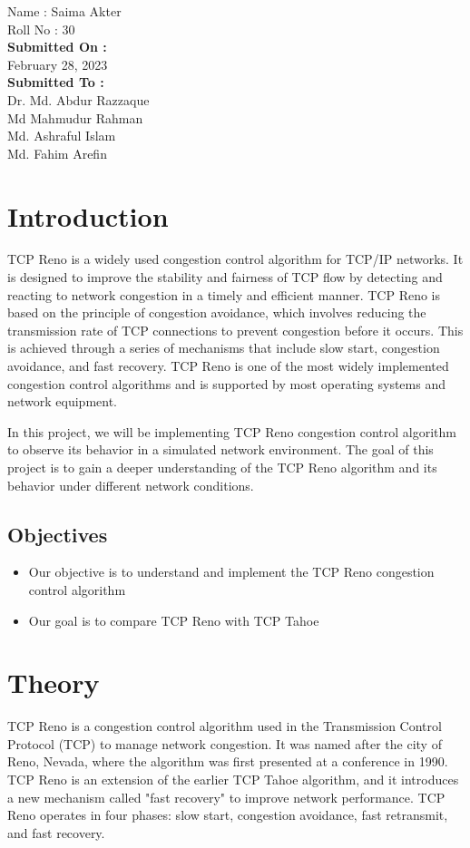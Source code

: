 \documentclass[11pt]{article}
\begin{document}
\begin{titlepage}
\begin{large}
			Name : Saima Akter\\[8pt]
			Roll No : 30\\[12pt]
		\textbf{Submitted On : \\[12pt]}
			February 28, 2023\\[20pt]
		\textbf{Submitted To :\\[12pt]}
			Dr. Md. Abdur Razzaque\\[12pt]
                Md Mahmudur Rahman\\[12pt]
                Md. Ashraful Islam\\[12pt]
                Md. Fahim Arefin
	\end{large}
\end{titlepage}

\section{Introduction}
TCP Reno is a widely used congestion control algorithm for TCP/IP networks. It is designed to improve the stability and fairness of TCP flow by detecting and reacting to network congestion in a timely and efficient manner. TCP Reno is based on the principle of congestion avoidance, which involves reducing the transmission rate of TCP connections to prevent congestion before it occurs. This is achieved through a series of mechanisms that include slow start, congestion avoidance, and fast recovery. TCP Reno is one of the most widely implemented congestion control algorithms and is supported by most operating systems and network equipment.

In this project, we will be implementing TCP Reno congestion control algorithm to observe its behavior in a simulated network environment. The goal of this project is to gain a deeper understanding of the TCP Reno algorithm and its behavior under different network conditions. 

\subsection{Objectives}
\begin{itemize}
    \item Our objective is to understand and implement the TCP Reno congestion control algorithm
    
    \item Our goal is to compare TCP Reno with TCP Tahoe

\end{itemize}
\section{Theory}
TCP Reno is a congestion control algorithm used in the Transmission Control Protocol (TCP) to manage network congestion. It was named after the city of Reno, Nevada, where the algorithm was first presented at a conference in 1990. TCP Reno is an extension of the earlier TCP Tahoe algorithm, and it introduces a new mechanism called "fast recovery" to improve network performance. TCP Reno operates in four phases: slow start, congestion avoidance, fast retransmit, and fast recovery.
\end{document}
